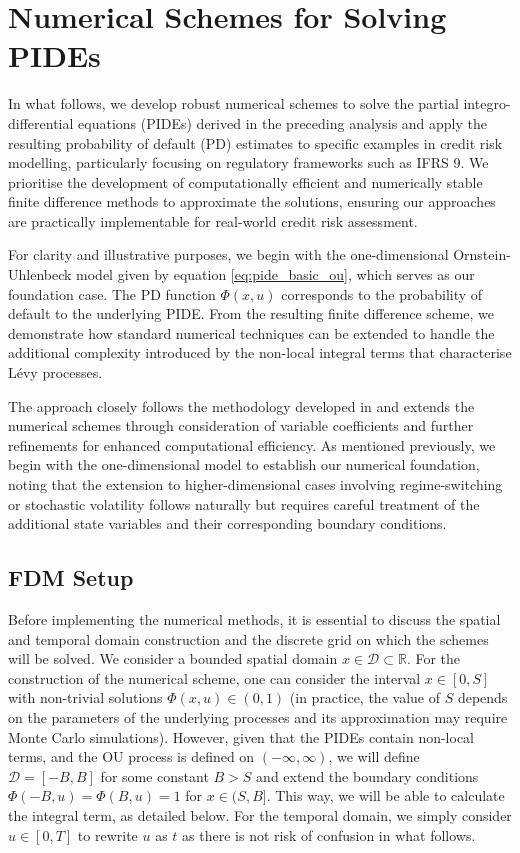 \documentclass[11pt,twoside,openright]{report}
\begin{document}
\section{Numerical Schemes for Solving PIDEs}

In what follows, we develop robust numerical schemes to solve the partial integro-differential equations (PIDEs) derived in the preceding analysis and apply the resulting probability of default (PD) estimates to specific examples in credit risk modelling, particularly focusing on regulatory frameworks such as IFRS 9. We prioritise the development of computationally efficient and numerically stable finite difference methods to approximate the solutions, ensuring our approaches are practically implementable for real-world credit risk assessment.

For clarity and illustrative purposes, we begin with the one-dimensional Ornstein-Uhlenbeck model given by equation \eqref{eq:pide_basic_ou}, which serves as our foundation case. The PD function $\Phi(x, u)$ corresponds to the probability of default to the underlying PIDE. From the resulting finite difference scheme, we demonstrate how standard numerical techniques can be extended to handle the additional complexity introduced by the non-local integral terms that characterise Lévy processes.

The approach closely follows the methodology developed in \cite{cont2005finite} and extends the numerical schemes through consideration of variable coefficients and further refinements for enhanced computational efficiency. As mentioned previously, we begin with the one-dimensional model to establish our numerical foundation, noting that the extension to higher-dimensional cases involving regime-switching or stochastic volatility follows naturally but requires careful treatment of the additional state variables and their corresponding boundary conditions.

\subsection{FDM Setup}

Before implementing the numerical methods, it is essential to discuss the spatial and temporal domain construction and the discrete grid on which the schemes will be solved. We consider a bounded spatial domain $x \in \mathcal{D} \subset \mathbb{R}$. For the construction of the numerical scheme, one can consider the interval $x \in [0, S]$ with non-trivial solutions $\Phi(x, u) \in (0, 1)$ (in practice, the value of $S$ depends on the parameters of the underlying processes and its approximation may require Monte Carlo simulations). However, given that the PIDEs contain non-local terms, and the OU process is defined on $(-\infty, \infty)$, we will define $\mathcal{D} = [-B, B]$ for some constant $B > S$ and extend the boundary conditions $\Phi(-B, u) = \Phi(B, u) = 1$ for $x \in (S, B]$. This way, we will be able to calculate the integral term, as detailed below. For the temporal domain, we simply consider $u \in [0, T]$ to rewrite $u$ as $t$ as there is not risk of confusion in what follows.
\end{document}
